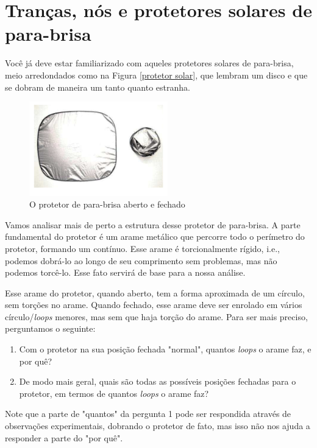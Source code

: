 \documentclass[a4paper,portuguese,11pt,twoside, leqno]{book}
\theoremstyle{definition}
\begin{document}
	\section{Tranças, nós e protetores solares de para-brisa}
	\hspace{12pt} Você já deve estar familiarizado com aqueles protetores solares de para-brisa, meio arredondados como na Figura \eqref{protetor solar}, que lembram um disco e que se dobram de maneira um tanto quanto estranha.
	
	\begin{figure}[H]
		\begin{center}
			\includegraphics[width=6cm]{protetor_solar.png}
		\end{center}\caption{O protetor de para-brisa aberto e fechado}\label{protetor solar}
	\end{figure}
	\par\vspace{0.3cm} Vamos analisar mais de perto a estrutura desse protetor de para-brisa. A parte fundamental do protetor é um arame metálico que percorre todo o perímetro do protetor, formando um  contínuo. Esse arame é torcionalmente rígido, i.e., podemos dobrá-lo ao longo de seu comprimento sem problemas, mas não podemos torcê-lo. Esse fato servirá de base para a nossa análise.
	\par\vspace{0.3cm} Esse arame do protetor, quando aberto, tem a forma aproximada de um círculo, sem torções no arame. Quando fechado, esse arame deve ser enrolado em vários círculo/\textit{loops} menores, mas sem que haja torção do arame. Para ser mais preciso, perguntamos o seguinte:
	\begin{enumerate}
		\item Com o protetor na sua posição fechada "normal", quantos \textit{loops} o arame faz, e por quê?
		\item De modo mais geral, quais são todas as possíveis posições fechadas para o protetor, em termos de quantos \textit{loops} o arame faz? 
	\end{enumerate} 
	\par\vspace{0.3cm} Note que a parte de "quantos" da pergunta 1 pode ser respondida através de observações experimentais, dobrando o protetor de fato, mas isso não nos ajuda a responder a parte do "por quê".
\end{document}
